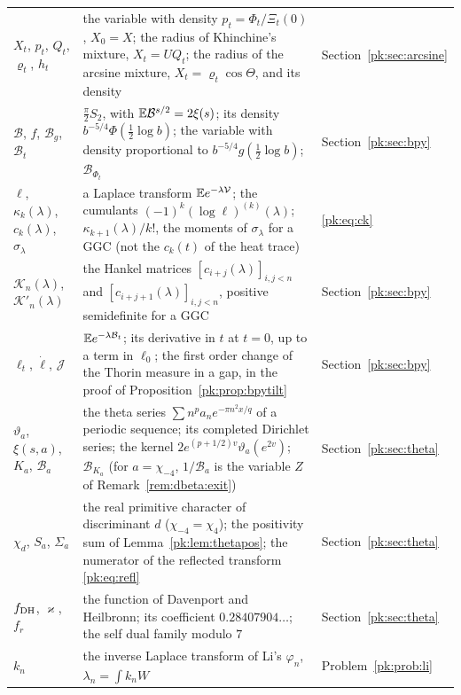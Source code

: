 {\begin{longtable}{@{}p{}p{}p{}@{}}
$X_t$, $p_t$, $Q_t$, $\varrho_t$, $h_t$ & \raggedright the variable with density ${p_t=\Phi_t/\Xi_t(0)}$, ${X_0=X}$; the radius of Khinchine's mixture, ${X_t=UQ_t}$; the radius of the arcsine mixture, ${X_t=\varrho_t\cos\Theta}$, and its density & \raggedright Section~\ref{pk:sec:arcsine}\tabularnewline
$\mathcal B$, $f$, $\mathcal B_g$, $\mathcal B_t$ & \raggedright ${\frac\pi2S_2}$, with ${\mathbb{E}\mathcal B^{s/2}=2\xi(s)}$; its density ${b^{-5/4}\Phi(\frac12\log b)}$; the variable with density proportional to ${b^{-5/4}g(\frac12\log b)}$; ${\mathcal B_{\Phi_t}}$ & \raggedright Section~\ref{pk:sec:bpy}\tabularnewline
$\ell$, $\kappa_k(\lambda)$, $c_k(\lambda)$, $\sigma_\lambda$ & \raggedright a Laplace transform ${\mathbb{E} e^{-\lambda\mathcal V}}$; the cumulants ${(-1)^k(\log\ell)^{(k)}(\lambda)}$; ${\kappa_{k+1}(\lambda)/k!}$, the moments of $\sigma_\lambda$ for a GGC (not the $c_k(t)$ of the heat trace) & \raggedright \eqref{pk:eq:ck}\tabularnewline
$\mathcal K_n(\lambda)$, $\mathcal K'_n(\lambda)$ & \raggedright the Hankel matrices ${[c_{i+j}(\lambda)]_{i,j<n}}$ and ${[c_{i+j+1}(\lambda)]_{i,j<n}}$, positive semidefinite for a GGC & \raggedright Section~\ref{pk:sec:bpy}\tabularnewline
$\ell_t$, $\dot\ell$, $\mathcal J$ & \raggedright ${\mathbb{E} e^{-\lambda\mathcal B_t}}$; its derivative in $t$ at ${t=0}$, up to a term in $\ell_0$; the first order change of the Thorin measure in a gap, in the proof of Proposition~\ref{pk:prop:bpytilt} & \raggedright Section~\ref{pk:sec:bpy}\tabularnewline
$\vartheta_a$, $\xi(s,a)$, $K_a$, $\mathcal B_a$ & \raggedright the theta series ${\sum n^pa_ne^{-\pi n^2x/q}}$ of a periodic sequence; its completed Dirichlet series; the kernel ${2e^{(p+1/2)v}\vartheta_a(e^{2v})}$; ${\mathcal B_{K_a}}$ (for ${a=\chi_{-4}}$, $1/\mathcal B_a$ is the variable $Z$ of Remark~\ref{rem:dbeta:exit}) & \raggedright Section~\ref{pk:sec:theta}\tabularnewline
$\chi_d$, $S_a$, $\Sigma_a$ & \raggedright the real primitive character of discriminant $d$ (${\chi_{-4}=\chi_4}$); the positivity sum of Lemma~\ref{pk:lem:thetapos}; the numerator of the reflected transform \eqref{pk:eq:refl} & \raggedright Section~\ref{pk:sec:theta}\tabularnewline
$f_{\rm DH}$, $\varkappa$, $f_r$ & \raggedright the function of Davenport and Heilbronn; its coefficient ${0.28407904\ldots}$; the self dual family modulo $7$ & \raggedright Section~\ref{pk:sec:theta}\tabularnewline
$k_n$ & \raggedright the inverse Laplace transform of Li's $\varphi_n$, ${\lambda_n=\int k_nW}$ & \raggedright Problem~\ref{pk:prob:li}\tabularnewline
\bottomrule
\end{longtable}}


